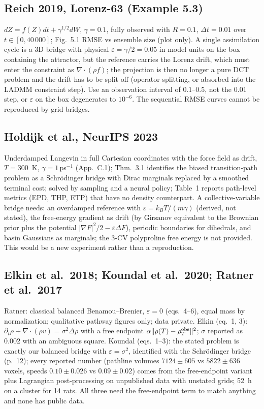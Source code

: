 \documentclass[11pt]{article}
\newcommand{\eps}{\varepsilon}
\newcommand{\dv}{\nabla\cdot}
\begin{document}
\subsection{Reich 2019, Lorenz-63 (Example 5.3)}
$dZ=f(Z)dt+\gamma^{1/2}dW$, $\gamma=0.1$, fully observed with $R=0.1$, $\Delta t=0.01$ over $t\in[0,40\,000]$; Fig.~5.1 RMSE vs ensemble size (plot only). A single assimilation cycle is a 3D bridge with physical $\eps=\gamma/2=0.05$ in model units on the box containing the attractor, but the reference carries the Lorenz drift, which must enter the constraint as $\dv(\rho f)$; the projection is then no longer a pure DCT problem and the drift has to be split off (operator splitting, or absorbed into the LADMM constraint step). Use an observation interval of $0.1$--$0.5$, not the $0.01$ step, or $\eps$ on the box degenerates to $10^{-6}$. The sequential RMSE curves cannot be reproduced by grid bridges.

\subsection{Holdijk et al., NeurIPS 2023}
Underdamped Langevin in full Cartesian coordinates with the force field as drift, $T=300$~K, $\gamma=1\,$ps$^{-1}$ (App.~C.1); Thm.~3.1 identifies the biased transition-path problem as a Schr\"odinger bridge with Dirac marginals replaced by a smoothed terminal cost; solved by sampling and a neural policy; Table~1 reports path-level metrics (EPD, THP, ETP) that have no density counterpart. A collective-variable bridge needs: an overdamped reference with $\eps=k_BT/(m\gamma)$ (derived, not stated), the free-energy gradient as drift (by Girsanov equivalent to the Brownian prior plus the potential $|\nabla F|^2/2-\eps\Delta F$), periodic boundaries for dihedrals, and basin Gaussians as marginals; the 3-CV polyproline free energy is not provided. This would be a new experiment rather than a reproduction.

\subsection{Elkin et al.\ 2018; Koundal et al.\ 2020; Ratner et al.\ 2017}
Ratner: classical balanced Benamou--Brenier, $\eps=0$ (eqs.~4--6), equal mass by normalization; qualitative pathway figures only; data private. Elkin (eq.~1, 3): $\partial_t\rho+\dv(\rho v)=\sigma^2\Delta\rho$ with a free endpoint $\alpha\|\rho(T)-\rho_T^{\rm obs}\|^2$; $\sigma$ reported as $0.002$ with an ambiguous square. Koundal (eqs.~1--3): the stated problem is exactly our balanced bridge with $\eps=\sigma^2$, identified with the Schr\"odinger bridge (p.~12); every reported number (pathline volumes $7124\pm605$ vs $5822\pm636$ voxels, speeds $0.10\pm0.026$ vs $0.09\pm0.02$) comes from the free-endpoint variant plus Lagrangian post-processing on unpublished data with unstated grids; 52~h on a cluster for 14 rats. All three need the free-endpoint term to match anything and none has public data.
\end{document}
